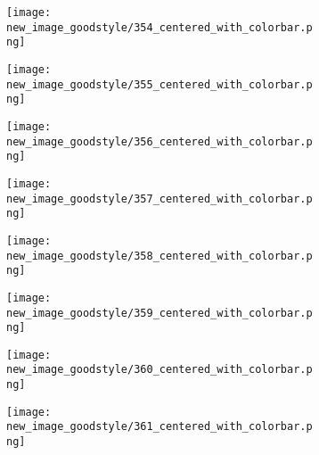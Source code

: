 \documentclass[a4paper,12pt]{article}
\begin{document}
\begin{figure}[H]
  \begin{subfigure}{0.11\textwidth}
    \texttt{[image: new\_image\_goodstyle/354\_centered\_with\_colorbar.png]}
  \end{subfigure}
  \hfill
  \begin{subfigure}{0.11\textwidth}
    \texttt{[image: new\_image\_goodstyle/355\_centered\_with\_colorbar.png]}
  \end{subfigure}
  \hfill
  \begin{subfigure}{0.11\textwidth}
    \texttt{[image: new\_image\_goodstyle/356\_centered\_with\_colorbar.png]}
  \end{subfigure}
  \hfill
  \begin{subfigure}{0.11\textwidth}
    \texttt{[image: new\_image\_goodstyle/357\_centered\_with\_colorbar.png]}
  \end{subfigure}
  \hfill
  \begin{subfigure}{0.11\textwidth}
    \texttt{[image: new\_image\_goodstyle/358\_centered\_with\_colorbar.png]}
  \end{subfigure}
  \hfill
  \begin{subfigure}{0.11\textwidth}
    \texttt{[image: new\_image\_goodstyle/359\_centered\_with\_colorbar.png]}
  \end{subfigure}
  \hfill
  \begin{subfigure}{0.11\textwidth}
    \texttt{[image: new\_image\_goodstyle/360\_centered\_with\_colorbar.png]}
  \end{subfigure}
  \hfill
  \begin{subfigure}{0.11\textwidth}
    \texttt{[image: new\_image\_goodstyle/361\_centered\_with\_colorbar.png]}
  \end{subfigure}
  \hfill
\end{figure}
\end{document}
